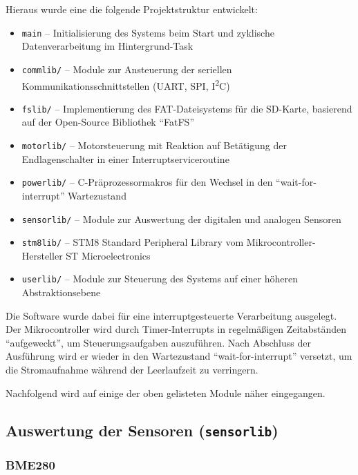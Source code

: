     Hieraus wurde eine die folgende Projektstruktur entwickelt:
    \begin{itemize}
        \item \texttt{main} -- Initialisierung des Systems beim Start und zyklische Datenverarbeitung im Hintergrund-Task
        \item \texttt{commlib/} -- Module zur Ansteuerung der seriellen Kommunikationsschnittstellen (UART, SPI, I\textsuperscript{2}C)
        \item \texttt{fslib/} -- Implementierung des FAT-Dateisystems für die SD-Karte, basierend auf der Open-Source Bibliothek ``FatFS''~\cite{elmchan_fatfs}
        \item \texttt{motorlib/} -- Motorsteuerung mit Reaktion auf Betätigung der Endlagenschalter in einer Interruptserviceroutine
        \item \texttt{powerlib/} -- C-Präprozessormakros für den Wechsel in den ``wait-for-interrupt'' Wartezustand
        \item \texttt{sensorlib/} -- Module zur Auswertung der digitalen und analogen Sensoren
        \item \texttt{stm8lib/} -- STM8 Standard Peripheral Library vom Mikrocontroller-Hersteller ST Microelectronics
        \item \texttt{userlib/} -- Module zur Steuerung des Systems auf einer höheren Abstraktionsebene
    \end{itemize}

    Die Software wurde dabei für eine interruptgesteuerte Verarbeitung ausgelegt. Der Mikrocontroller wird durch Timer-Interrupts in regelmäßigen Zeitabständen ``aufgeweckt'', um Steuerungsaufgaben auszuführen. Nach Abschluss der Ausführung wird er wieder in den Wartezustand ``wait-for-interrupt'' versetzt, um die Stromaufnahme während der Leerlaufzeit zu verringern.
    
    Nachfolgend wird auf einige der oben gelisteten Module näher eingegangen.
    
    \subsection{Auswertung der Sensoren (\texttt{sensorlib})}
    
        \subsubsection{BME280}\label{ssec:BME280}
    
